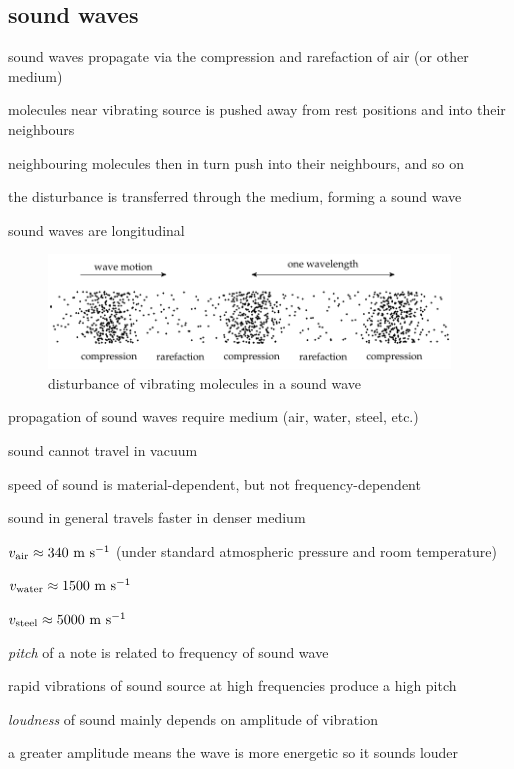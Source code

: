\subsection{sound waves}

sound waves propagate via the compression and rarefaction of air (or other medium) 

molecules near vibrating source is pushed away from rest positions and into their neighbours

neighbouring molecules then in turn push into their neighbours, and so on

the disturbance is transferred through the medium, forming a sound wave

\cmt sound waves are longitudinal
	
\begin{figure}[htp]
\centering
	\includegraphics[width=0.95\textwidth]{longitudinal.pdf}
	\caption*{disturbance of vibrating molecules in a sound wave}
\end{figure}

\cmt propagation of sound waves require medium (air, water, steel, etc.)
	
sound cannot travel in vacuum
	
\cmt speed of sound is material-dependent, but not frequency-dependent
	
	sound in general travels faster in denser medium
	
	\titem $v_\text{air} \approx 340 \text{ m s$^{-1}$}$ (under standard atmospheric pressure and room temperature)
	
	\titem $v_\text{water} \approx 1500 \text{ m s$^{-1}$}$
	
	\titem $v_\text{steel} \approx 5000 \text{ m s$^{-1}$}$
	
\cmt \emph{pitch} of a note is related to frequency of sound wave

rapid vibrations of sound source at high frequencies produce a high pitch

\cmt \emph{loudness} of sound mainly depends on amplitude of vibration

a greater amplitude means the wave is more energetic so it sounds louder
	

